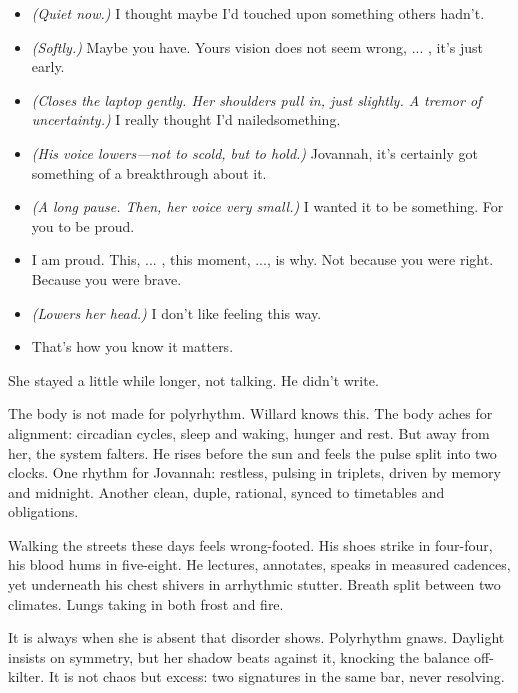 \begin{itemize}
    \item[\textbf{Jovannah:}] \textit{(Quiet now.)} I thought maybe I’d touched upon something others hadn’t.

    \item[\textbf{Willard:}] \textit{(Softly.)} Maybe you have. Yours vision does not seem wrong, ... , it’s just early.

    \item[\textbf{Jovannah:}] \textit{(Closes the laptop gently. Her shoulders pull in, just slightly. A tremor of uncertainty.)} I really thought I'd nailedsomething.

    \item[\textbf{Willard:}] \textit{(His voice lowers—not to scold, but to hold.)} Jovannah, it’s certainly got something of a breakthrough about it.

    \item[\textbf{Jovannah:}] \textit{(A long pause. Then, her voice very small.)} I wanted it to be something. For you to be proud.

    \item[\textbf{Willard:}]  I am proud. This, ... , this moment, ..., is why. Not because you were right. Because you were brave.

    \item[\textbf{Jovannah:}] \textit{(Lowers her head.)} I don’t like feeling this way.

    \item[\textbf{Willard:}] That’s how you know it matters.
\end{itemize}

She stayed a little while longer, not talking. He didn’t write.

The body is not made for polyrhythm. Willard knows this. The body aches for alignment: circadian cycles, sleep and waking, hunger and rest. But away from her, the system falters. He rises before the sun and feels the pulse split into two clocks. One rhythm for Jovannah: restless, pulsing in triplets, driven by memory and midnight. Another clean, duple, rational, synced to timetables and obligations.

Walking the streets these days feels wrong-footed. His shoes strike in four-four, his blood hums in five-eight. He lectures, annotates, speaks in measured cadences, yet underneath his chest shivers in arrhythmic stutter. Breath split between two climates. Lungs taking in both frost and fire.

It is always when she is absent that disorder shows. Polyrhythm gnaws. Daylight insists on symmetry, but her shadow beats against it, knocking the balance off-kilter. It is not chaos but excess: two signatures in the same bar, never resolving.

